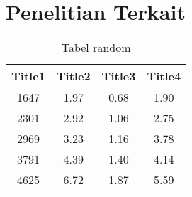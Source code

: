 \section{Penelitian Terkait}

\begin{table}[h]
	\caption{Tabel random}
	\vspace{0.25cm}
	\begin{center}
		\begin{tabular}{|c|c|c|c|}
			\hline
			Title1 & Title2 & Title3 & Title4  \tabularnewline
			\hline
			1647   & 1.97   & 0.68   & 1.90 \tabularnewline
			2301   & 2.92   & 1.06   & 2.75 \tabularnewline
			2969   & 3.23   & 1.16   & 3.78 \tabularnewline
			3791   & 4.39   & 1.40   & 4.14 \tabularnewline
			4625   & 6.72   & 1.87   & 5.59 \tabularnewline
			\hline
		\end{tabular}
	\end{center}
\end{table}